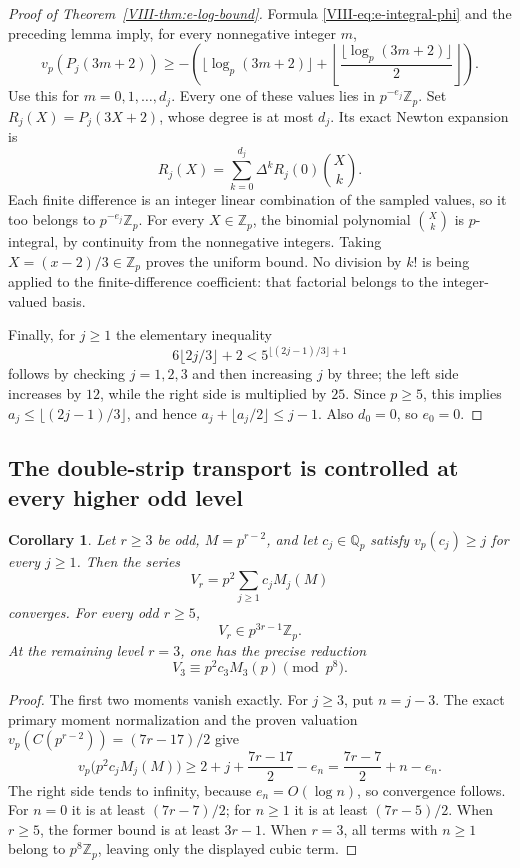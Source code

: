 \documentclass[11pt,letterpaper]{article}
\newtheorem{corollary}[theorem]{Corollary}
\numberwithin{equation}{section}
\begin{document}
\begin{proof}[Proof of Theorem~\ref{VIII-thm:e-log-bound}]
Formula \eqref{VIII-eq:e-integral-phi} and the preceding lemma imply, for
every nonnegative integer $m$,
\[
 v_p(P_j(3m+2))\ge
 -\left(\lfloor\log_p(3m+2)\rfloor+
 \left\lfloor\frac{\lfloor\log_p(3m+2)\rfloor}{2}\right\rfloor\right).
\]
Use this for $m=0,1,\ldots,d_j$. Every one of these values lies in
$p^{-e_j}\mathbb Z_p$. Set $R_j(X)=P_j(3X+2)$, whose degree is at
most $d_j$. Its exact Newton expansion is
\[
 R_j(X)=\sum_{k=0}^{d_j}\Delta^kR_j(0)\binom Xk.
\]
Each finite difference is an integer linear combination of the
sampled values, so it too belongs to $p^{-e_j}\mathbb Z_p$.
For every $X\in\mathbb Z_p$, the binomial polynomial $\binom Xk$
is $p$-integral, by continuity from the nonnegative integers.
Taking $X=(x-2)/3\in\mathbb Z_p$ proves the uniform bound.
No division by $k!$ is being applied to the finite-difference
coefficient: that factorial belongs to the integer-valued basis.

Finally, for $j\ge1$ the elementary inequality
\[
 6\lfloor2j/3\rfloor+2<5^{\lfloor(2j-1)/3\rfloor+1}
\]
follows by checking $j=1,2,3$ and then increasing $j$ by three;
the left side increases by $12$, while the right side is multiplied
by $25$. Since $p\ge5$, this implies
$a_j\le\lfloor(2j-1)/3\rfloor$, and hence
$a_j+\lfloor a_j/2\rfloor\le j-1$. Also $d_0=0$, so $e_0=0$.
\end{proof}

\subsection{The double-strip transport is controlled at every higher odd level}
\begin{corollary}\label{VIII-cor:e-double-strip-transport-bound}
Let $r\ge3$ be odd, $M=p^{r-2}$, and let $c_j\in\mathbb Q_p$ satisfy
$v_p(c_j)\ge j$ for every $j\ge1$. Then the series
\[
 V_r=p^2\sum_{j\ge1}c_jM_j(M)
\]
converges. For every odd $r\ge5$,
\[
 V_r\in p^{3r-1}\mathbb Z_p.
\]
At the remaining level $r=3$, one has the precise reduction
\[
 V_3\equiv p^2c_3M_3(p)\pmod{p^8}.
\]
\end{corollary}
\begin{proof}
The first two moments vanish exactly. For $j\ge3$, put $n=j-3$.
The exact primary moment normalization and the proven valuation
$v_p(C(p^{r-2}))=(7r-17)/2$ give
\[
 v_p\bigl(p^2c_jM_j(M)\bigr)
 \ge2+j+\frac{7r-17}{2}-e_n
 =\frac{7r-7}{2}+n-e_n.
\]
The right side tends to infinity, because $e_n=O(\log n)$, so
convergence follows. For $n=0$ it is at least $(7r-7)/2$;
for $n\ge1$ it is at least $(7r-5)/2$.
When $r\ge5$, the former bound is at least $3r-1$. When $r=3$,
all terms with $n\ge1$ belong to $p^8\mathbb Z_p$, leaving only
the displayed cubic term.
\end{proof}
\end{document}
